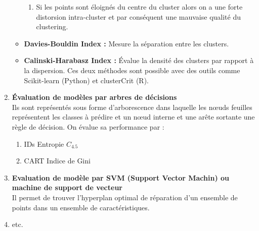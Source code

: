 \documentclass[a4paper, 12pt]{article}
\begin{document}
\begin{enumerate}
\begin{itemize}
\begin{enumerate}
				\item \justifying 	Si les points sont éloignés du centre du cluster alors on a une forte distorsion intra-cluster et par conséquent une mauvaise qualité du clustering.
			\end{enumerate}
			\item \justifying \textbf{Davies-Bouldin Index :} Mesure la séparation entre les clusters.
			\item \justifying \textbf{Calinski-Harabasz Index :} Évalue la densité des clusters par rapport à la dispersion.
			Ces deux méthodes sont possible avec des outils comme Scikit-learn (Python) et clusterCrit (R).
		\end{itemize}
		\item \justifying \textbf{	Évaluation de modèles par arbres de décisions}\\ Ils sont représentés sous forme d’arborescence dans laquelle les nœuds feuilles représentent les classes à prédire et un nœud interne et une arête sortante une règle de décision. On évalue sa performance par :
		\begin{enumerate}
			\item IDs Entropie $C_{4.5}$
			\item CART Indice de Gini
		\end{enumerate}
		\item \justifying \textbf{	Evaluation de modèle par SVM (Support Vector Machin) ou machine de support de vecteur}\\ Il permet de trouver l’hyperplan optimal de réparation d’un ensemble de points dans un ensemble de caractéristiques.
		\item \justifying etc.
	
	\end{enumerate}
\end{document}
